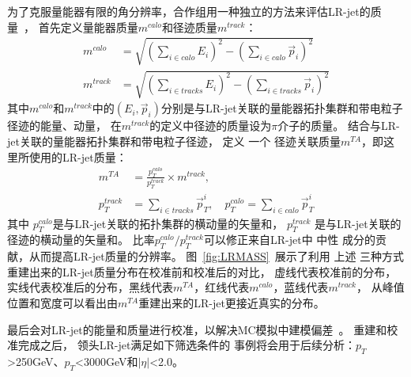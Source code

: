 为了克服量能器有限的角分辨率，合作组用一种独立的方法来评估LR-jet的质量~\cite{TAGGING5}，
首先定义量能器质量$m^{calo}$和径迹质量$m^{track}$：
\begin{equation} 
\label{eq:LRMASS1}
 \begin{split}
  m^{calo}&=\sqrt{(\sum_{i\in  calo} E_i )^2-(\sum_{i\in calo} \vec{p}_i)^2}
  \\
  m^{track}&=\sqrt{(\sum_{i\in tracks} E_i )^2-(\sum_{i\in tracks} \vec{p}_i)^2}
 \end{split}
\end{equation}
其中$m^{calo}$和$m^{track}$中的$(E_i,\vec{p}_i)$分别是与LR-jet关联的量能器拓扑集群和带电粒子径迹的能量、动量，
在$m^{track}$的定义中径迹的质量设为$\pi$介子的质量。
结合与LR-jet关联的量能器拓扑集群和带电粒子径迹，
定义
一个
径迹关联质量$m^{TA}$，即这里所使用的LR-jet质量：
\begin{equation} 
\label{eq:LRMASS2}
 \begin{split}
m^{TA}&=\frac{p_{T}^{calo}}{p_{T}^{track}} \times m^{track},
\\
p_{T}^{track}&=\sum_{i\in tracks} \vec{p}_T^i, \quad p_{T}^{calo}=\sum_{i\in calo} \vec{p}_T^i
 \end{split}
\end{equation}
其中
$p_{T}^{calo}$是与LR-jet关联的拓扑集群的横动量的矢量和，
$p_{T}^{track}$ 是与LR-jet关联的径迹的横动量的矢量和。
比率$p_{T}^{calo}/p_{T}^{track}$可以修正来自LR-jet中
中性
成分的贡献，从而提高LR-jet质量的分辨率。
图~\ref{fig:LRMASS}~展示了利用
上述
三种方式重建出来的LR-jet质量分布在校准前和校准后的对比，
虚线代表校准前的分布，实线代表校准后的分布，黑线代表$m^{TA}$，红线代表$m^{calo}$，蓝线代表$m^{track}$，
从峰值位置和宽度可以看出由$m^{TA}$重建出来的LR-jet更接近真实的分布。

最后会对LR-jet的能量和质量进行校准，以解决MC模拟中建模偏差~\cite{JETM-2018-02}。
重建和校准完成之后，
领头LR-jet满足如下筛选条件的
事例将会用于后续分析：$p_{T}$>250GeV、$p_{T}$<3000GeV和$|\eta|$<2.0。


